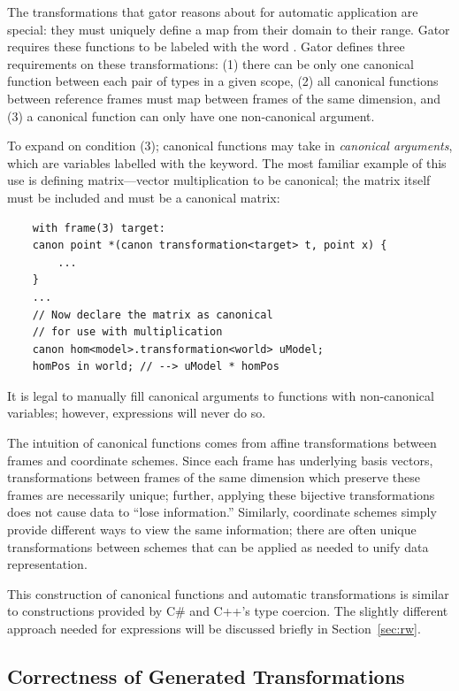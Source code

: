 The transformations that gator reasons about for automatic application are special: they must uniquely define a map from their domain to their range. 
Gator requires these functions to be labeled with the word .
Gator defines three requirements on these transformations:
(1) there can be only one canonical function between each pair of types in a given scope, (2) all canonical functions between reference frames must map between frames of the same dimension, and (3) a canonical function can only have one non-canonical argument.

To expand on condition (3); canonical functions may take in \emph{canonical arguments}, which are variables labelled with the  keyword.  The most familiar example of this use is defining matrix---vector multiplication to be canonical; the matrix itself must be included and must be a canonical matrix:
%
\begin{verbatim}
	with frame(3) target:
	canon point *(canon transformation<target> t, point x) {
		...
	}
	...
	// Now declare the matrix as canonical 
	// for use with multiplication
	canon hom<model>.transformation<world> uModel;
	homPos in world; // --> uModel * homPos
\end{verbatim}
%
It is legal to manually fill canonical arguments to functions with non-canonical variables; however,  expressions will never do so.

The intuition of canonical functions comes from affine transformations between frames and coordinate schemes.
Since each frame has underlying basis vectors, transformations between frames of the same dimension which preserve these frames are necessarily unique; further, applying these bijective transformations does not cause data to ``lose information.''
Similarly, coordinate schemes simply provide different ways to view the same information; there are often unique transformations between schemes that can be applied as needed to unify data representation.

This construction of canonical functions and automatic transformations is similar to constructions provided by C\# and C++'s type coercion.
The slightly different approach needed for  expressions will be discussed briefly in Section~\ref{sec:rw}.

\subsection{Correctness of Generated Transformations}

